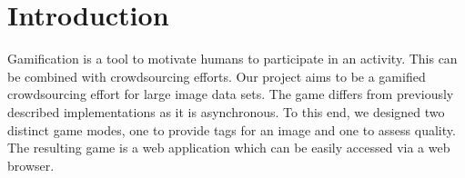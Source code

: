\section{Introduction}
\label{g14:sec:introduction}

Gamification is a tool to motivate humans to participate in an activity. This can be combined with crowdsourcing efforts. Our project aims to be a gamified crowdsourcing effort for large image data sets. The game differs from previously described implementations as it is asynchronous. To this end, we designed two distinct game modes, one to provide tags for an image and one to assess quality. The resulting game is a web application which can be easily accessed via a web browser.


